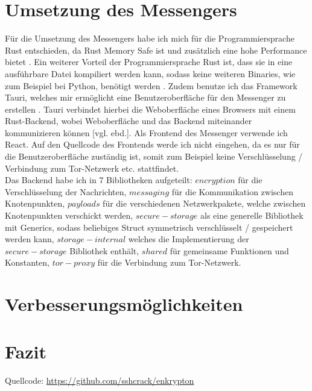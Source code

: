 \documentclass[a4paper,ngerman, headheight=28pt,12pt]{scrartcl}
\newcommand{\vcite}[1]{\cite[vgl.][]{#1}}
\newcommand{\vebd}{[vgl. ebd.]}
\begin{document}
\section{Umsetzung des Messengers}
Für die Umsetzung des Messengers habe ich mich für die Programmiersprache Rust entschieden, da Rust Memory Safe ist und zusätzlich eine hohe Performance bietet \vcite{RustSecurity}. Ein weiterer Vorteil der Programmiersprache Rust ist, dass sie in eine ausführbare Datei kompiliert werden kann, sodass keine weiteren Binaries, wie zum Beispiel bei Python, benötigt werden \vcite{RustCompile}. Zudem benutze ich das Framework Tauri, welches mir ermöglicht eine Benutzeroberfläche für den Messenger zu erstellen \vcite{RustTauri}. Tauri verbindet hierbei die Weboberfläche eines Browsers mit einem Rust-Backend, wobei Weboberfläche und das Backend miteinander kommunizieren können \vebd. Als Frontend des Messenger verwende ich React. Auf den Quellcode des Frontends werde ich nicht eingehen, da es nur für die Benutzeroberfläche zuständig ist, somit zum Beispiel keine Verschlüsselung / Verbindung zum Tor-Netzwerk etc. stattfindet. \\
Das Backend habe ich in 7 Bibliotheken aufgeteilt: $encryption$ für die Verschlüsselung der Nachrichten, $messaging$ für die Kommunikation zwischen Knotenpunkten, $payloads$ für die verschiedenen Netzwerkpakete, welche zwischen Knotenpunkten verschickt werden, $secure-storage$ als eine generelle Bibliothek mit Generics, sodass beliebiges Struct symmetrisch verschlüsselt / gespeichert werden kann, $storage-internal$ welches die Implementierung der $secure-storage$ Bibliothek enthält, $shared$ für gemeinsame Funktionen und Konstanten, $tor-proxy$ für die Verbindung zum Tor-Netzwerk.



\section{Verbesserungsmöglichkeiten}

\section{Fazit}

\pagebreak
\nolinenumbers{}
\printbibliography[notkeyword={figure}]
\label{LastPageDoc}

\pagebreak
{}%
\appendix
\printbibliography[heading=subbibliography,title={Anhang},keyword={figure}]
Quellcode: \href{https://github.com/sshcrack/enkrypton}{https://github.com/sshcrack/enkrypton}
\end{document}
